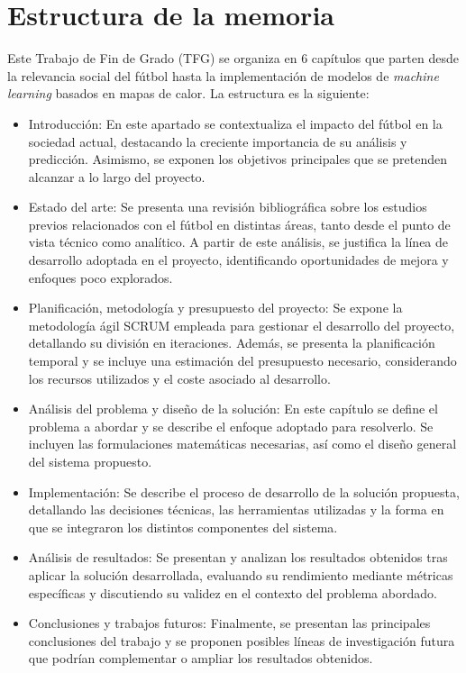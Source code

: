 \section{Estructura de la memoria}
Este Trabajo de Fin de Grado (TFG) se organiza en 6 capítulos que parten desde la relevancia social del fútbol hasta la implementación de modelos de \textit{machine learning} basados en mapas de calor. La estructura es la siguiente:

\begin{itemize}
    \item Introducción: En este apartado se contextualiza el impacto del fútbol en la sociedad actual, destacando la creciente importancia de su análisis y predicción. Asimismo, se exponen los objetivos principales que se pretenden alcanzar a lo largo del proyecto.
    \item Estado del arte: Se presenta una revisión bibliográfica sobre los estudios previos relacionados con el fútbol en distintas áreas, tanto desde el punto de vista técnico como analítico. A partir de este análisis, se justifica la línea de desarrollo adoptada en el proyecto, identificando oportunidades de mejora y enfoques poco explorados.
    \item Planificación, metodología y presupuesto del proyecto: Se expone la metodología ágil SCRUM empleada para gestionar el desarrollo del proyecto, detallando su división en iteraciones. Además, se presenta la planificación temporal y se incluye una estimación del presupuesto necesario, considerando los recursos utilizados y el coste asociado al desarrollo.
    \item Análisis del problema y diseño de la solución: En este capítulo se define el problema a abordar y se describe el enfoque adoptado para resolverlo. Se incluyen las formulaciones matemáticas necesarias, así como el diseño general del sistema propuesto.
    \item Implementación: Se describe el proceso de desarrollo de la solución propuesta, detallando las decisiones técnicas, las herramientas utilizadas y la forma en que se integraron los distintos componentes del sistema.
    \item Análisis de resultados: Se presentan y analizan los resultados obtenidos tras aplicar la solución desarrollada, evaluando su rendimiento mediante métricas específicas y discutiendo su validez en el contexto del problema abordado.
    \item Conclusiones y trabajos futuros: Finalmente, se presentan las principales conclusiones del trabajo y se proponen posibles líneas de investigación futura que podrían complementar o ampliar los resultados obtenidos.
\end{itemize}


